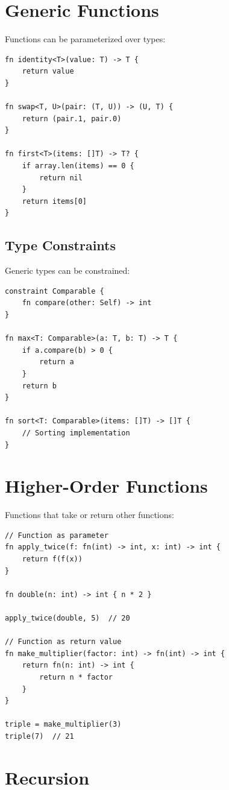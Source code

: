\section{Generic Functions}

Functions can be parameterized over types:

\begin{lstlisting}
fn identity<T>(value: T) -> T {
    return value
}

fn swap<T, U>(pair: (T, U)) -> (U, T) {
    return (pair.1, pair.0)
}

fn first<T>(items: []T) -> T? {
    if array.len(items) == 0 {
        return nil
    }
    return items[0]
}
\end{lstlisting}

\subsection{Type Constraints}

Generic types can be constrained:

\begin{lstlisting}
constraint Comparable {
    fn compare(other: Self) -> int
}

fn max<T: Comparable>(a: T, b: T) -> T {
    if a.compare(b) > 0 {
        return a
    }
    return b
}

fn sort<T: Comparable>(items: []T) -> []T {
    // Sorting implementation
}
\end{lstlisting}

\section{Higher-Order Functions}

Functions that take or return other functions:

\begin{lstlisting}
// Function as parameter
fn apply_twice(f: fn(int) -> int, x: int) -> int {
    return f(f(x))
}

fn double(n: int) -> int { n * 2 }

apply_twice(double, 5)  // 20

// Function as return value
fn make_multiplier(factor: int) -> fn(int) -> int {
    return fn(n: int) -> int {
        return n * factor
    }
}

triple = make_multiplier(3)
triple(7)  // 21
\end{lstlisting}

\section{Recursion}

